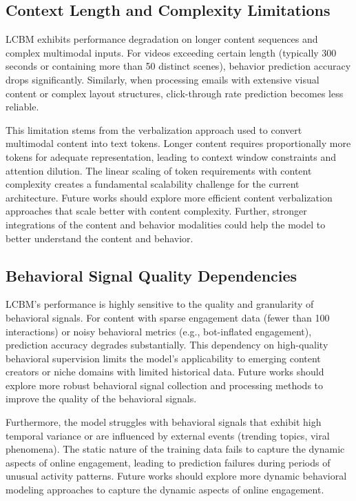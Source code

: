\subsection{Context Length and Complexity Limitations}

LCBM exhibits performance degradation on longer content sequences and complex multimodal inputs. For videos exceeding certain length (typically 300 seconds or containing more than 50 distinct scenes), behavior prediction accuracy drops significantly. Similarly, when processing emails with extensive visual content or complex layout structures, click-through rate prediction becomes less reliable.

This limitation stems from the verbalization approach used to convert multimodal content into text tokens. Longer content requires proportionally more tokens for adequate representation, leading to context window constraints and attention dilution. The linear scaling of token requirements with content complexity creates a fundamental scalability challenge for the current architecture. Future works should explore more efficient content verbalization approaches that scale better with content complexity. Further, stronger integrations of the content and behavior modalities could help the model to better understand the content and behavior.

\subsection{Behavioral Signal Quality Dependencies}

LCBM's performance is highly sensitive to the quality and granularity of behavioral signals. For content with sparse engagement data (fewer than 100 interactions) or noisy behavioral metrics (e.g., bot-inflated engagement), prediction accuracy degrades substantially. This dependency on high-quality behavioral supervision limits the model's applicability to emerging content creators or niche domains with limited historical data. Future works should explore more robust behavioral signal collection and processing methods to improve the quality of the behavioral signals.

Furthermore, the model struggles with behavioral signals that exhibit high temporal variance or are influenced by external events (trending topics, viral phenomena). The static nature of the training data fails to capture the dynamic aspects of online engagement, leading to prediction failures during periods of unusual activity patterns. Future works should explore more dynamic behavioral modeling approaches to capture the dynamic aspects of online engagement.



